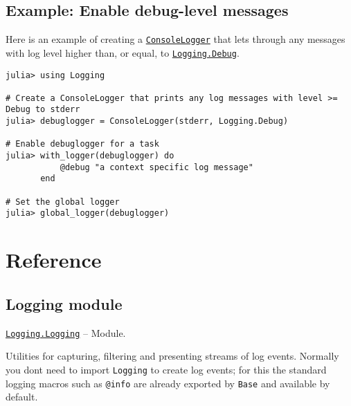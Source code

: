 \hypertarget{3206764809486875623}{}


\subsection{Example: Enable debug-level messages}



Here is an example of creating a \hyperlink{14105182192150729642}{\texttt{ConsoleLogger}} that lets through any messages with log level higher than, or equal, to \href{@ref}{\texttt{Logging.Debug}}.




\begin{verbatim}
julia> using Logging

# Create a ConsoleLogger that prints any log messages with level >= Debug to stderr
julia> debuglogger = ConsoleLogger(stderr, Logging.Debug)

# Enable debuglogger for a task
julia> with_logger(debuglogger) do
           @debug "a context specific log message"
       end

# Set the global logger
julia> global_logger(debuglogger)
\end{verbatim}



\hypertarget{15956208855154540711}{}


\section{Reference}



\hypertarget{9952495786425959332}{}


\subsection{Logging module}


\hypertarget{1488091939099076420}{}
\hyperlink{1488091939099076420}{\texttt{Logging.Logging}}  -- {Module.}

\begin{adjustwidth}{2em}{0pt}

Utilities for capturing, filtering and presenting streams of log events. Normally you don{\textquotesingle}t need to import \texttt{Logging} to create log events; for this the standard logging macros such as \texttt{@info} are already exported by \texttt{Base} and available by default.



\end{adjustwidth}

